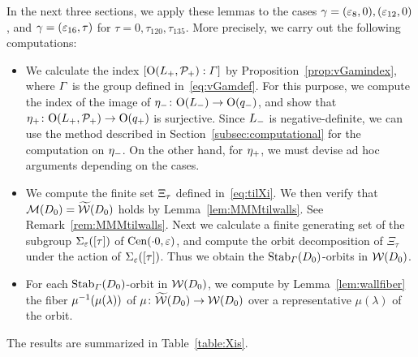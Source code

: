 \documentclass{amsart} %
\begin{document}
%
In the next three sections, we apply these lemmas to the cases $\gamma=(\varepsilon_8, 0), (\varepsilon_{12}, 0)$,
and $\gamma=(\varepsilon_{16}, \tau)$ for $\tau=0, \tau_{120}, \tau_{135}$.
More precisely,
we carry out the following computations:
%
\begin{itemize}
\item 
We calculate the index $[\mathord{\mathrm{O}}(L_{+}, \mathord{\mathcal{P}}_{+}):  \varGamma]$ 
by Proposition~\ref{prop:vGamindex},
where $\varGamma$ is the group defined in~\eqref{eq:vGamdef}.
 For this purpose, 
we compute  the index of 
the image of ${\eta}_{-}\colon \mathord{\mathrm{O}}(L_{-})\to \mathord{\mathrm{O}}(q_{-})$, and 
show that 
${\eta}_{+}\colon \mathord{\mathrm{O}}(L_{+}, \mathord{\mathcal{P}}_{+})\to \mathord{\mathrm{O}}(q_{+})$
is surjective.
Since $L_{-}$ is negative-definite,
we can use the method described in Section~\ref{subsec:computational}
for the computation on  ${\eta}_{-}$.
On the other hand, 
for ${\eta}_{+}$, 
we must devise ad hoc arguments depending on the cases.
\item 
We compute the finite set $\Xi_{\tau}$
defined in~\eqref{eq:tilXi}.
%
%
We then verify that $\mathord{\mathcal{M}}(D_0)=\widetilde{\mathord{\mathcal{W}}} (D_0)$ holds
by Lemma~\ref{lem:MMMtilwalls}.
See Remark~\ref{rem:MMMtilwalls}.
Next we 
calculate a finite generating set of 
the subgroup $\Sigma_{\varepsilon}([\tau])$ of $\mathrm{Cen}(\cdot 0, \varepsilon)$,
and 
compute the orbit decomposition of $\Xi_{\tau}$ under the action of $\Sigma_{\varepsilon}([\tau])$.
Thus we obtain 
the $\operatorname{Stab}_{\varGamma}(D_0)$-orbits in $\mathord{\mathcal{W}}(D_0)$.
\item
For each $\operatorname{Stab}_{\varGamma}(D_0)$-orbit in $\mathord{\mathcal{W}}(D_0)$,
we compute by Lemma~\ref{lem:wallfiber} the fiber $\mu^{-1}(\mu(\lambda))$ of $\mu\colon \widetilde{\mathord{\mathcal{W}}}(D_0)\to \mathord{\mathcal{W}}(D_0)$
over a representative $\mu(\lambda)$ of the orbit.
\end{itemize}
%
The results are summarized in Table~\ref{table:Xis}.
%
%
\end{document}
